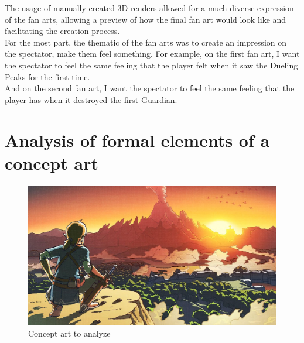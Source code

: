\documentclass{cup-pan}
\begin{document}
    The usage of manually created 3D renders allowed for a much diverse expression of the fan arts, allowing a preview of how the final fan art would look like and facilitating the creation process.\\

    For the most part, the thematic of the fan arts was to create an impression on the spectator, make them feel something. For example, on the first fan art, I want the spectator to feel the same feeling that the player felt when it saw the Dueling Peaks for the first time. \\

    And on the second fan art, I want the spectator to feel the same feeling that the player has when it destroyed the first Guardian.


\section{Analysis of formal elements of a concept art}
    \begin{figure}[H]
       \includegraphics[width=\textwidth]{Imagenes/Referencias/conceptart_a_analizar_2.png}
        \caption{Concept art to analyze}
    \end{figure}
\end{document}
